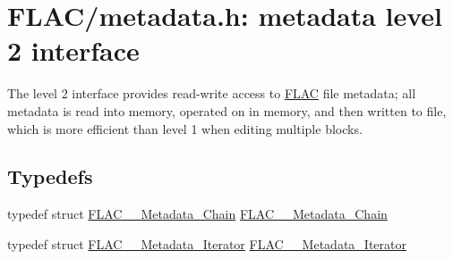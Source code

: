 \hypertarget{group__flac__metadata__level2}{}\section{F\+L\+A\+C/metadata.h\+: metadata level 2 interface}
\label{group__flac__metadata__level2}


The level 2 interface provides read-\/write access to \hyperlink{namespace_f_l_a_c}{F\+L\+AC} file metadata; all metadata is read into memory, operated on in memory, and then written to file, which is more efficient than level 1 when editing multiple blocks.  


\subsection*{Typedefs}
\begin{DoxyCompactItemize}
\item 
typedef struct \hyperlink{struct_f_l_a_c_____metadata___chain}{F\+L\+A\+C\+\_\+\+\_\+\+Metadata\+\_\+\+Chain} \hyperlink{group__flac__metadata__level2_gaec6993c60b88f222a52af86f8f47bfdf}{F\+L\+A\+C\+\_\+\+\_\+\+Metadata\+\_\+\+Chain}
\item 
typedef struct \hyperlink{struct_f_l_a_c_____metadata___iterator}{F\+L\+A\+C\+\_\+\+\_\+\+Metadata\+\_\+\+Iterator} \hyperlink{group__flac__metadata__level2_ga9f3e135a07cdef7e51597646aa7b89b2}{F\+L\+A\+C\+\_\+\+\_\+\+Metadata\+\_\+\+Iterator}
\end{DoxyCompactItemize}
